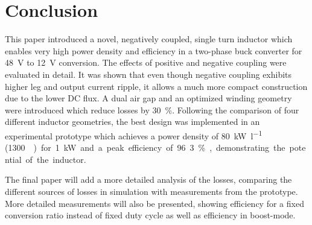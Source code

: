 \documentclass{IPEC2026}
\begin{document}
\section{Conclusion}
This paper introduced a novel, negatively coupled, single turn inductor which enables very high power density and efficiency in a two-phase buck converter for \qty{48}{\V} to \qty{12}{\V} conversion. The effects of positive and negative coupling were evaluated in detail. It was shown that even though negative coupling exhibits higher leg and output current ripple, it allows a much more compact construction due to the lower DC flux. A dual air gap and an optimized winding geometry were introduced which reduce losses by \qty{30}{\percent}. Following the comparison of four different inductor geometries, the best design was implemented in an experimental prototype which achieves a power density of \qty{80}{\kW\per\l} (\qty{1300}{\W\per\cubic\inch}) for \qty{1}{\kW} and a peak efficiency of 96.3\%, demonstrating the potential of the inductor. \par
The final paper will add a more detailed analysis of the losses, comparing the different sources of losses in simulation with measurements from the prototype. More detailed measurements will also be presented, showing efficiency for a fixed conversion ratio instead of fixed duty cycle as well as efficiency in boost-mode. %



\end{document}
